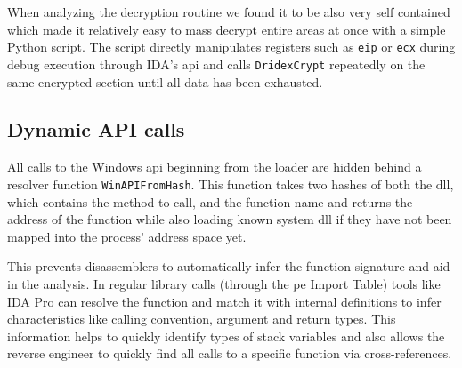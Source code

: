 When analyzing the decryption routine we found it to be also very self contained which made it relatively easy to mass decrypt entire areas at once with a simple Python script.
The script directly manipulates registers such as \lstinline|eip| or \lstinline|ecx| during debug execution through IDA's \gls{api} and calls \lstinline|DridexCrypt| repeatedly on the same encrypted section until all data has been exhausted.

\subsection{Dynamic API calls\label{subsec:Reverse_engineering_Dridex::Obfuscation_measures::Dynamic_API_calls}}
All calls to the Windows \gls{api} beginning from the loader are hidden behind a resolver function \lstinline|WinAPIFromHash|.
This function takes two hashes of both the \gls{dll}, which contains the method to call, and the function name and returns the address of the function while also loading known system \gls{dll} if they have not been mapped into the process' address space yet.

This prevents disassemblers to automatically infer the function signature and aid in the analysis.
In regular library calls (through the \gls{pe} Import Table) tools like IDA Pro can resolve the function and match it with internal definitions to infer characteristics like calling convention, argument and return types.
This information helps to quickly identify types of stack variables and also allows the reverse engineer to quickly find all calls to a specific function via cross-references.

